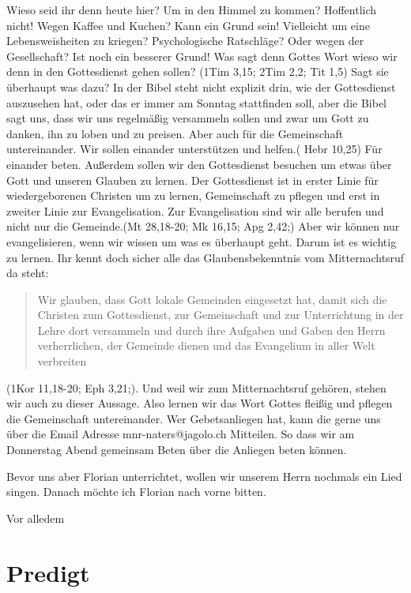 \begin{spacing}{1.5}
Wieso seid ihr denn heute hier? Um in den Himmel zu kommen? Hoffentlich nicht! Wegen Kaffee und Kuchen? Kann ein Grund sein! Vielleicht um eine Lebensweisheiten zu kriegen? Psychologische Ratschläge? Oder wegen der Gesellschaft? Ist noch ein besserer Grund! Was sagt denn Gottes Wort wieso wir denn in den Gottesdienst gehen sollen? (1Tim 3,15; 2Tim 2,2; Tit 1,5) Sagt sie überhaupt was dazu? In der Bibel steht nicht explizit drin, wie der Gottesdienst auszusehen hat, oder das er immer am Sonntag stattfinden soll, aber die Bibel sagt uns, dass wir uns regelmäßig versammeln sollen und zwar um Gott zu danken, ihn zu loben und zu preisen. Aber auch für die Gemeinschaft untereinander. Wir sollen einander unterstützen und helfen.( Hebr 10,25) Für einander beten. Außerdem sollen wir den Gottesdienst besuchen um etwas über Gott und unseren Glauben zu lernen. Der Gottesdienst ist in erster Linie für wiedergeborenen Christen um zu lernen, Gemeinschaft zu pflegen und erst in zweiter Linie zur Evangelisation. Zur Evangelisation sind wir alle berufen und nicht nur die Gemeinde.(Mt 28,18-20; Mk 16,15; Apg 2,42;) Aber wir können nur evangelisieren, wenn wir wissen um was es überhaupt geht. Darum ist es wichtig zu lernen. Ihr kennt doch sicher alle das Glaubensbekenntnis vom Mitternachtsruf da steht:
\begin{quote}
    Wir glauben, dass Gott lokale Gemeinden eingesetzt hat, damit sich die Christen zum Gottesdienst, zur Gemeinschaft und zur Unterrichtung in der Lehre dort versammeln und durch ihre Aufgaben und Gaben den Herrn verherrlichen, der Gemeinde dienen und das Evangelium in aller Welt verbreiten 
\end{quote}
(1Kor 11,18-20; Eph 3,21;).
Und weil wir zum Mitternachtsruf gehören, stehen wir auch zu dieser Aussage. Also lernen wir das Wort Gottes fleißig und pflegen die Gemeinschaft untereinander. Wer Gebetsanliegen hat, kann die gerne uns über die Email Adresse mnr-naters@jagolo.ch Mitteilen. So dass wir am Donnerstag Abend gemeinsam Beten über die Anliegen beten können.

Bevor uns aber Florian unterrichtet, wollen wir unserem Herrn nochmals ein Lied singen. Danach möchte ich Florian nach vorne bitten.

\glqq Vor alledem \grqq{} 

\end{spacing}


\section{Predigt}

